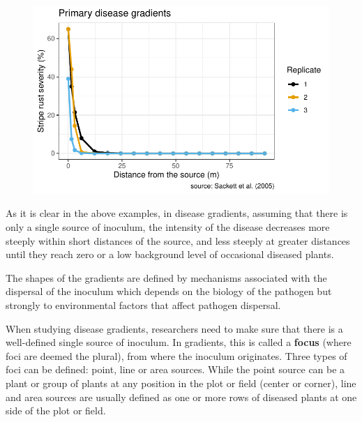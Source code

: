 \documentclass[
  letterpaper,
  DIV=11,
  numbers=noendperiod]{scrreprt}
\begin{document}
\begin{figure}[H]

{\centering \includegraphics{./spatial-gradients_files/figure-pdf/unnamed-chunk-6-1.pdf}

}

\end{figure}

As it is clear in the above examples, in disease gradients, assuming
that there is only a single source of inoculum, the intensity of the
disease decreases more steeply within short distances of the source, and
less steeply at greater distances until they reach zero or a low
background level of occasional diseased plants.

The shapes of the gradients are defined by mechanisms associated with
the dispersal of the inoculum which depends on the biology of the
pathogen but strongly to environmental factors that affect pathogen
dispersal.

When studying disease gradients, researchers need to make sure that
there is a well-defined single source of inoculum. In gradients, this is
called a \textbf{focus} (where foci are deemed the plural), from where
the inoculum originates. Three types of foci can be defined: point, line
or area sources. While the point source can be a plant or group of
plants at any position in the plot or field (center or corner), line and
area sources are usually defined as one or more rows of diseased plants
at one side of the plot or field.
\end{document}
